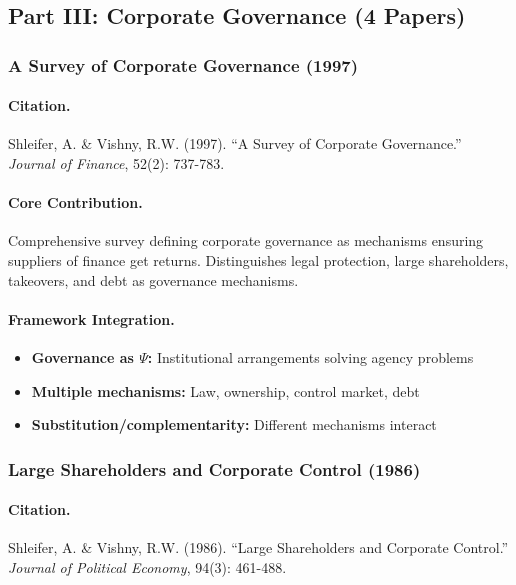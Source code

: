 \documentclass[12pt,a4paper]{article}
\begin{document}
\subsection{Part III: Corporate Governance (4 Papers)}

\subsubsection{A Survey of Corporate Governance (1997)}

\paragraph{Citation.}
Shleifer, A. \& Vishny, R.W. (1997).
``A Survey of Corporate Governance.'' \emph{Journal of Finance}, 52(2): 737-783.

\paragraph{Core Contribution.}
Comprehensive survey defining corporate governance as mechanisms ensuring
suppliers of finance get returns. Distinguishes legal protection, large
shareholders, takeovers, and debt as governance mechanisms.

\paragraph{Framework Integration.}
\begin{itemize}
  \item \textbf{Governance as $\Psi$:} Institutional arrangements solving agency problems
  \item \textbf{Multiple mechanisms:} Law, ownership, control market, debt
  \item \textbf{Substitution/complementarity:} Different mechanisms interact
\end{itemize}

\subsubsection{Large Shareholders and Corporate Control (1986)}

\paragraph{Citation.}
Shleifer, A. \& Vishny, R.W. (1986).
``Large Shareholders and Corporate Control.''
\emph{Journal of Political Economy}, 94(3): 461-488.
\end{document}
